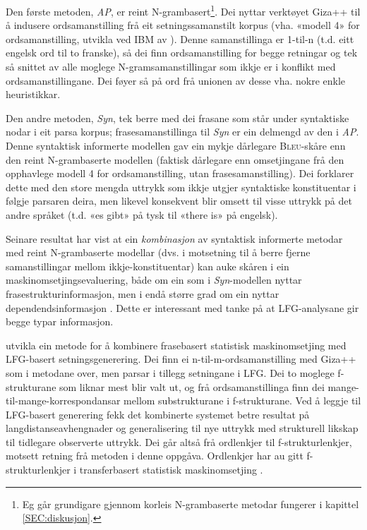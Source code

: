\documentclass[11pt,a4paper,oneside,draft]{book}
\newcommand{\Bleu}{\textsc{Bleu}}
\begin{document}
Den første metoden, \emph{AP}, er reint N-grambasert\footnote{Eg går grundigare gjennom korleis N-grambaserte metodar
        fungerer i kapittel \ref{SEC:diskusjon}. }. Dei nyttar
verktøyet Giza++ \citep[Och~og~Ney,~2000,~i][s.~50]{koehn2003spb} til
å indusere ordsamanstilling frå eit setningssamanstilt korpus
(vha. «modell 4» for ordsamanstilling, utvikla ved IBM av
\citet{brown1993msm}). Denne samanstillinga er 1-til-n (t.d. eitt
engelsk ord til to franske), så dei finn ordsamanstilling for begge
retningar og tek så snittet av alle moglege N-gramsamanstillingar som
ikkje er i konflikt med ordsamanstillingane. Dei føyer så på ord frå
unionen av desse vha. nokre enkle heuristikkar.

Den andre metoden, \emph{Syn}, tek berre med dei frasane som står under
syntaktiske nodar i eit parsa korpus; frasesamanstillinga til \emph{Syn} er
ein delmengd av den i \emph{AP}. Denne syntaktisk informerte modellen gav
ein mykje dårlegare \Bleu-skåre enn den reint N-grambaserte modellen
(faktisk dårlegare enn omsetjingane frå den opphavlege modell 4 for
ordsamanstilling, utan frasesamanstilling). Dei forklarer dette med
den store mengda uttrykk som ikkje utgjer syntaktiske konstituentar i
følgje parsaren deira, men likevel konsekvent blir omsett til visse
uttrykk på det andre språket (t.d. «es gibt» på tysk til «there is» på
engelsk). 

Seinare resultat har vist at ein \emph{kombinasjon} av syntaktisk
informerte metodar med reint N-grambaserte modellar (dvs. i motsetning
til å berre fjerne samanstillingar mellom ikkje-konstituentar) kan
auke skåren i ein maskinomsetjingsevaluering, både om ein som i
\emph{Syn}-modellen nyttar frasestrukturinformasjon, men i endå større
grad om ein nyttar dependendsinformasjon
\citep{tinsley2007ept,hearne2008ccd}. Dette er interessant med tanke
på at LFG-analysane gir begge typar informasjon.

\citet{riezler2006gmt} utvikla ein metode for å kombinere frasebasert
statistisk maskinomsetjing med LFG-basert setningsgenerering. Dei finn
ei n-til-m-ordsamanstilling med Giza++ som i metodane over, men parsar
i tillegg setningane i LFG. Dei to moglege f-strukturane som liknar
mest blir valt ut, og frå ordsamanstillinga finn dei
mange-til-mange-korrespondansar mellom substrukturane i
f-strukturane. Ved å leggje til LFG-basert generering fekk det
kombinerte systemet betre resultat på langdistanseavhengnader og
generalisering til nye uttrykk med strukturell likskap til tidlegare
observerte uttrykk. Dei går altså frå ordlenkjer til
f-strukturlenkjer, motsett retning frå metoden i denne
oppgåva. Ordlenkjer har au gitt f-strukturlenkjer i transferbasert
statistisk maskinomsetjing
\citep{graham2010dsl,graham2009osr,graham2009fts}.
\end{document}

